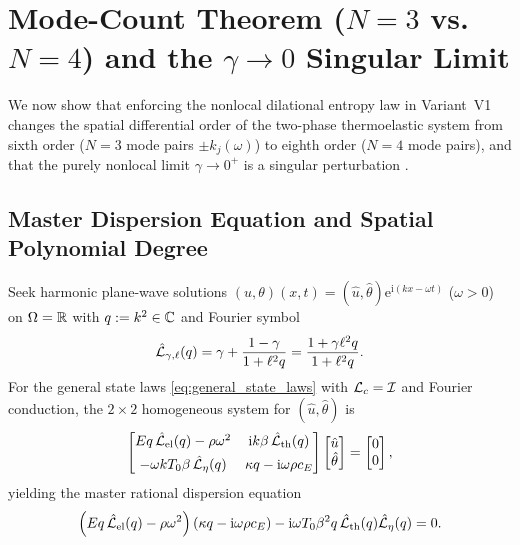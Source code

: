 \section{Mode-Count Theorem ($N=3$ vs.\ $N=4$) and the $\gamma \to 0$ Singular Limit}\label{sec:mode_count}

We now show that enforcing the nonlocal dilational entropy law in Variant~V1 changes the spatial differential order of the two-phase thermoelastic system from sixth order ($N=3$ mode pairs $\pm k_j(\omega)$) to eighth order ($N=4$ mode pairs), and that the purely nonlocal limit $\gamma \to 0^+$ is a singular perturbation \cite{MikhasevNobili2020}.

\subsection{Master Dispersion Equation and Spatial Polynomial Degree}\label{subsec:master_dispersion}

Seek harmonic plane-wave solutions $(u,\theta)(x,t) = (\hat{u},\hat{\theta})\mathrm{e}^{\mathrm{i}(kx-\omega t)}$ ($\omega > 0$) on $\Omega = \mathbb{R}$ with $q := k^2 \in \mathbb{C}$ and Fourier symbol
\begin{equation}\label{eq:L_symbol}
  \hat{\mathcal{L}}_{\gamma,\ell}(q) = \gamma + \frac{1-\gamma}{1+\ell^2 q} = \frac{1 + \gamma\ell^2 q}{1 + \ell^2 q}.
\end{equation}
For the general state laws \eqref{eq:general_state_laws} with $\mathcal{L}_c = \mathcal{I}$ and Fourier conduction, the $2\times 2$ homogeneous system for $(\hat{u},\hat{\theta})$ is
\begin{equation}\label{eq:harmonic_matrix}
  \begin{bmatrix}
    E q\,\hat{\mathcal{L}}_{\mathrm{el}}(q) - \rho\omega^2 & \mathrm{i}k\beta\,\hat{\mathcal{L}}_{\mathrm{th}}(q) \\[4pt]
    -\omega k T_0\beta\,\hat{\mathcal{L}}_\eta(q) & \kappa q - \mathrm{i}\omega\rho c_E
  \end{bmatrix}
  \begin{bmatrix}
    \hat{u} \\ \hat{\theta}
  \end{bmatrix}
  = \begin{bmatrix} 0 \\ 0 \end{bmatrix},
\end{equation}
yielding the master rational dispersion equation
\begin{equation}\label{eq:master_dispersion}
  \left(E q\,\hat{\mathcal{L}}_{\mathrm{el}}(q) - \rho\omega^2\right)\left(\kappa q - \mathrm{i}\omega\rho c_E\right) - \mathrm{i}\omega T_0\beta^2 q\,\hat{\mathcal{L}}_{\mathrm{th}}(q)\hat{\mathcal{L}}_\eta(q) = 0.
\end{equation}

